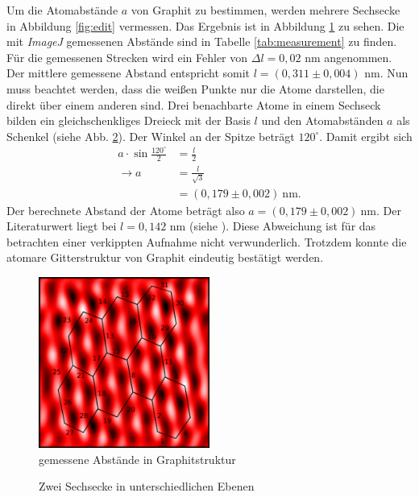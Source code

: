 Um die Atomabstände $a$ von Graphit zu bestimmen, werden mehrere Sechsecke in Abbildung \ref{fig:edit} vermessen. Das Ergebnis ist in Abbildung \ref{fig:measurement} zu sehen. Die mit \textit{ImageJ} gemessenen Abstände sind in Tabelle \ref{tab:measurement} zu finden. Für die gemessenen Strecken wird ein Fehler von $\Delta l=0,02$ nm angenommen. Der mittlere gemessene Abstand entspricht somit $l=(0,311 \pm 0,004)$ nm. 
Nun muss beachtet werden, dass die weißen Punkte nur die Atome darstellen, die direkt über einem anderen sind. Drei benachbarte Atome in einem Sechseck bilden ein gleichschenkliges Dreieck mit der Basis $l$ und den Atomabständen $a$ als Schenkel (siehe Abb. \ref{fig:triangle}). Der Winkel an der Spitze beträgt $120^\circ$. Damit ergibt sich
\begin{align*}
a\cdot\sin{\frac{120^\circ}{2}} &= \frac{l}{2}\\
\rightarrow a &= \frac{l}{\sqrt{3}}\\
  &= (0,179 \pm 0,002) \ \mathrm{nm}.
\end{align*} Der berechnete Abstand der Atome beträgt also $a = (0,179 \pm 0,002) \ \si{\nano\metre}$. Der Literaturwert liegt bei $l=0,142$ nm (siehe \cite{graphit}). Diese Abweichung ist für das betrachten einer verkippten Aufnahme nicht verwunderlich. Trotzdem konnte die atomare Gitterstruktur von Graphit eindeutig bestätigt werden.

\newpage

\begin{figure}[h]
  \centering
  \includegraphics[width=0.5\textwidth]{data/graphit_kilian/measurement_final.png}
  \caption{gemessene Abstände in Graphitstruktur}
  \label{fig:measurement}
\end{figure}

\begin{figure}[h]
\centering

\caption{Zwei Sechsecke in unterschiedlichen Ebenen}
\label{fig:triangle}
\end{figure}


